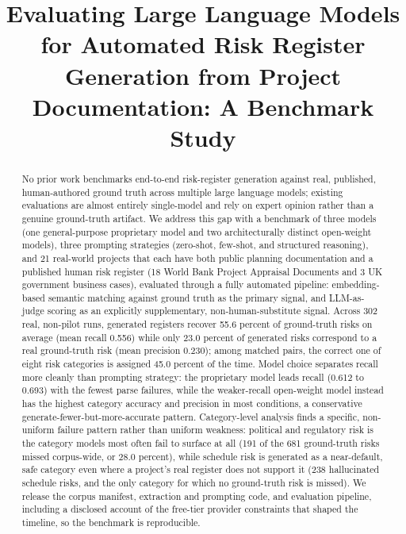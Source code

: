 \documentclass[10pt, conference, letterpaper]{IEEEtran}
\begin{document}
\title{Evaluating Large Language Models for Automated Risk Register
Generation from Project Documentation: A Benchmark Study}

\author{%
\and
{}
}

\maketitle

\begin{abstract}
No prior work benchmarks end-to-end risk-register generation against real,
published, human-authored ground truth across multiple large language
models; existing evaluations are almost entirely single-model and rely on
expert opinion rather than a genuine ground-truth artifact. We address this
gap with a benchmark of three models (one general-purpose proprietary model
and two architecturally distinct open-weight models), three prompting
strategies (zero-shot, few-shot, and structured reasoning), and 21
real-world projects that each have both public planning documentation and a
published human risk register (18 World Bank Project Appraisal Documents
and 3 UK government business cases), evaluated through a fully automated
pipeline: embedding-based semantic matching against ground truth as the
primary signal, and LLM-as-judge scoring as an explicitly supplementary,
non-human-substitute signal. Across 302 real, non-pilot runs, generated
registers recover 55.6 percent of ground-truth risks on average (mean
recall 0.556) while only 23.0 percent of generated risks correspond to a
real ground-truth risk (mean precision 0.230); among matched pairs, the
correct one of eight risk categories is assigned 45.0 percent of the time.
Model choice separates recall more cleanly than prompting strategy: the
proprietary model leads recall (0.612 to 0.693) with the fewest parse
failures, while the weaker-recall open-weight model instead has the highest
category accuracy and precision in most conditions, a conservative
generate-fewer-but-more-accurate pattern. Category-level analysis finds a
specific, non-uniform failure pattern rather than uniform weakness:
political and regulatory risk is the category models most often fail to
surface at all (191 of the 681 ground-truth risks missed corpus-wide, or
28.0 percent), while schedule risk is
generated as a near-default, safe category even where a project's real
register does not support it (238 hallucinated schedule risks, and the only
category for which no ground-truth risk is missed). We release the corpus manifest, extraction and prompting code, and
evaluation pipeline, including a disclosed account of the free-tier
provider constraints that shaped the timeline, so the benchmark is
reproducible.
\end{abstract}
\end{document}
